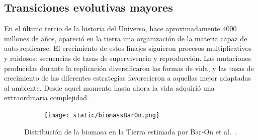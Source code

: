 \documentclass[a4paper,11pt]{book}
\theoremstyle{definition}
\begin{document}
\subsection{Transiciones evolutivas mayores}

En el \'ultimo tercio de la historia del Universo, hace aproximadamente 4000 millones de a\~nos, apareci\'o en la tierra una organizaci\'on de la materia capaz de auto-replicarse.
%
El crecimiento de estos linajes siguieron procesos multiplicativos y ruidosos: secuencias de tasas de supervivencia y reproducci\'on.
%
Las mutaciones producidas durante la replicaci\'on diversificaron las formas de vida, y las tasas de crecimiento de las diferentes estrategias favorecieron a aquellas mejor adaptadas al ambiente.
%
Desde aquel momento hasta ahora la vida adquiri\'o una extraordinaria complejidad.

%

\begin{figure}[ht!]
    \centering
    \begin{subfigure}[b]{0.65\textwidth}
    \texttt{[image: static/biomassBarOn.png]}
    \end{subfigure}
    \caption{
	Distribuci\'on de la biomasa en la Tierra estimada por Bar-On et al.~\cite{barOn2018-biomass}.
    }
    \label{fig:biomass}
\end{figure}

\end{document}
